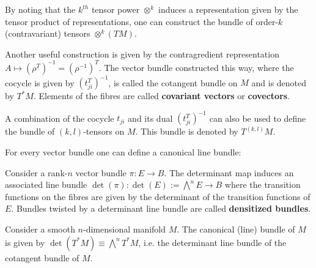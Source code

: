     \begin{example}
        By noting that the $k^{th}$ tensor power $\otimes^k$ induces a representation given by the tensor product of representations, one can construct the bundle of order-$k$ (contravariant) tensors $\otimes^k(TM)$.
    \end{example}
    \begin{example}\label{bundle:cotangent_bundle}
        Another useful construction is given by the contragredient representation $A\mapsto (\rho^T)^{-1}=(\rho^{-1})^T$. The vector bundle constructed this way, where the cocycle is given by $(t_{ji}^T)^{-1}$, is called the cotangent bundle on $M$ and is denoted by $T^*M$. Elements of the fibres are called \textbf{covariant vectors} or \textbf{covectors}.
    \end{example}
    \begin{notation}
        A combination of the cocycle $t_{ji}$ and its dual $(t_{ji}^T)^{-1}$ can also be used to define the bundle of $(k,l)$-tensors on $M$. This bundle is denoted by $T^{(k,l)}M$.
    \end{notation}


    For every vector bundle one can define a canonical line bundle:
    \begin{construct}
        Consider a rank-$n$ vector bundle $\pi:E\rightarrow B$. The determinant map induces an associated line bundle $\det(\pi):\det(E):=\bigwedge^nE\rightarrow B$ where the transition functions on the fibres are given by the determinant of the transition functions of $E$. Bundles twisted by a determinant line bundle are called \textbf{densitized bundles}.
    \end{construct}
    \begin{example}\label{bundle:canonical_bundle}
        Consider a smooth $n$-dimensional manifold $M$. The canonical (line) bundle of $M$ is given by $\det(T^*M)\equiv\bigwedge^nT^*M$, i.e. the determinant line bundle of the cotangent bundle of $M$.
    \end{example}

